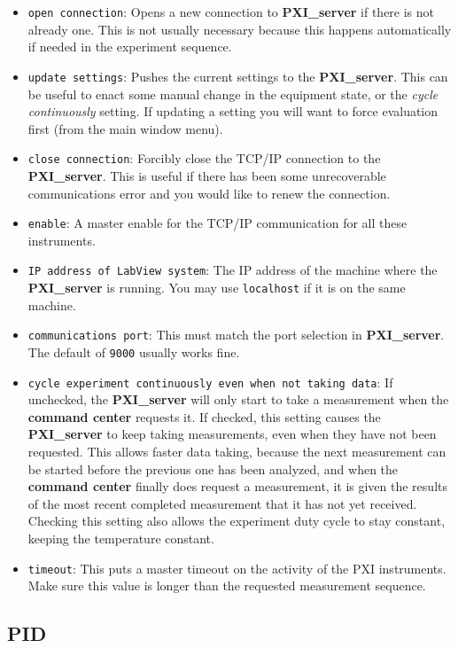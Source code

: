 \documentclass[pdftex,11pt,letterpaper]{article}
\begin{document}
\begin{itemize}
\item \texttt{open connection}:  Opens a new connection to \textbf{PXI\_server} if there is not already one.  This is not usually necessary because this happens automatically if needed in the experiment sequence.
\item \texttt{update settings}: Pushes the current settings to the \textbf{PXI\_server}.  This can be useful to enact some manual change in the equipment state, or the \textit{cycle continuously} setting.  If updating a setting you will want to force evaluation first (from the main window menu).
\item \texttt{close connection}:  Forcibly close the TCP/IP connection to the \textbf{PXI\_server}.  This is useful if there has been some unrecoverable communications error and you would like to renew the connection.
\item \texttt{enable}: A master enable for the TCP/IP communication for all these instruments.
\item \texttt{IP address of LabView system}: The IP address of the machine where the \textbf{PXI\_server} is running.  You may use \texttt{localhost} if it is on the same machine.
\item \texttt{communications port}: This must match the port selection in \textbf{PXI\_server}.  The default of \texttt{9000} usually works fine.
\item \texttt{cycle experiment continuously even when not taking data}: If unchecked, the \textbf{PXI\_server} will only start to take a measurement when the \textbf{command center} requests it.  If checked, this setting causes the \textbf{PXI\_server} to keep taking measurements, even when they have not been requested.  This allows faster data taking, because the next measurement can be started before the previous one has been analyzed, and when the \textbf{command center} finally does request a measurement, it is given the results of the most recent completed measurement that it has not yet received.  Checking this setting also allows the experiment duty cycle to stay constant, keeping the temperature constant.
\item \texttt{timeout}:  This puts a master timeout on the activity of the PXI instruments.  Make sure this value is longer than the requested measurement sequence.
\end{itemize}

\subsection{PID}
\end{document}
